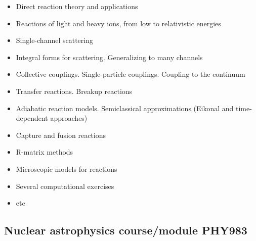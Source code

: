\documentclass[%
twoside,                 %
final,                   %
10pt]{article}
\begin{document}
\begin{itemize}
\item Direct reaction theory and applications

\item Reactions of light and heavy ions, from low to relativistic energies

\item Single-channel scattering

\item Integral forms for scattering. Generalizing to many channels

\item Collective couplings. Single-particle couplings. Coupling to the continuum

\item Transfer reactions. Breakup reactions

\item Adiabatic reaction models. Semiclassical approximations (Eikonal and time-dependent approaches)

\item Capture and fusion reactions

\item R-matrix methods

\item Microscopic models for reactions

\item Several computational exercises

\item etc
\end{itemize}

\noindent



\subsection{Nuclear astrophysics course/module PHY983}

\end{document}
